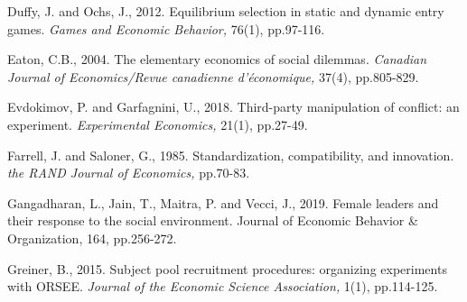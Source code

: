 \documentclass[12pt, letterpaper]{article}
\theoremstyle{plain}
\begin{document}
\begin{thebibliography}{10}

\bibitem{} Duffy, J. and Ochs, J., 2012. Equilibrium selection in static and dynamic entry games. \textit{Games and Economic Behavior,} 76(1), pp.97-116.


\bibitem{}Eaton, C.B., 2004. The elementary economics of social dilemmas. \textit{Canadian Journal of Economics/Revue canadienne d'\'{e}conomique,} 37(4), pp.805-829.

  Evdokimov, P. and Garfagnini, U., 2018. Third-party manipulation of conflict: an experiment. \textit{Experimental Economics,} 21(1), pp.27-49.

  Farrell, J. and Saloner, G., 1985. Standardization, compatibility, and innovation. \textit{the RAND Journal of Economics,} pp.70-83.

 Gangadharan, L., Jain, T., Maitra, P. and Vecci, J., 2019. Female leaders and their response to the social environment. Journal of Economic Behavior & Organization, 164, pp.256-272.





\bibitem{} Greiner, B., 2015. Subject pool recruitment procedures: organizing experiments with ORSEE. \textit{Journal of the Economic Science Association,} 1(1), pp.114-125.




\end{thebibliography}
\end{document}
